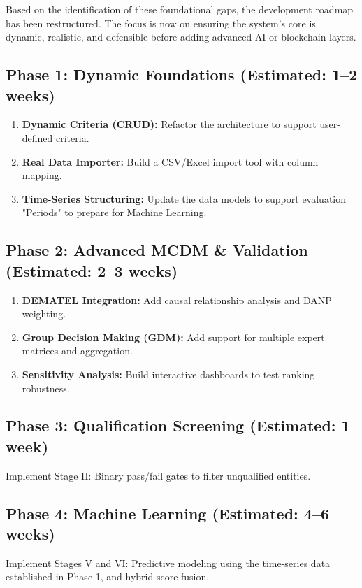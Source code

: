 \documentclass[11pt]{article}
\begin{document}
Based on the identification of these foundational gaps, the development roadmap has been restructured. The focus is now on ensuring the system's core is dynamic, realistic, and defensible before adding advanced AI or blockchain layers.

\subsection{Phase 1: Dynamic Foundations (Estimated: 1--2 weeks)}
\begin{enumerate}
    \item \textbf{Dynamic Criteria (CRUD):} Refactor the architecture to support user-defined criteria.
    \item \textbf{Real Data Importer:} Build a CSV/Excel import tool with column mapping.
    \item \textbf{Time-Series Structuring:} Update the data models to support evaluation "Periods" to prepare for Machine Learning.
\end{enumerate}

\subsection{Phase 2: Advanced MCDM \& Validation (Estimated: 2--3 weeks)}
\begin{enumerate}
    \item \textbf{DEMATEL Integration:} Add causal relationship analysis and DANP weighting.
    \item \textbf{Group Decision Making (GDM):} Add support for multiple expert matrices and aggregation.
    \item \textbf{Sensitivity Analysis:} Build interactive dashboards to test ranking robustness.
\end{enumerate}

\subsection{Phase 3: Qualification Screening (Estimated: 1 week)}
Implement Stage II: Binary pass/fail gates to filter unqualified entities.

\subsection{Phase 4: Machine Learning (Estimated: 4--6 weeks)}
Implement Stages V and VI: Predictive modeling using the time-series data established in Phase 1, and hybrid score fusion.
\end{document}
